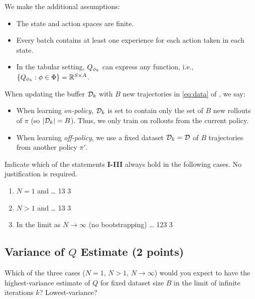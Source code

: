 We make the additional assumptions: 
\begin{itemize}
	\item The state and action spaces are finite.
	\item Every batch contains at least one experience for each action taken in each state.
	\item In the tabular setting, $Q_{\phi_k}$ can express any function, i.e., $\{Q_{\phi_k}:\phi\in\Phi\}=\mathbb{R}^{S\times A}$.
\end{itemize}
When updating the buffer $\mathcal{D}_k$ with $B$ new trajectories in \cref{eq:data} of , we say:
\begin{itemize}
    \item When learning \textit{on-policy}, $\mathcal{D}_k$ is set to contain only the set of $B$ new rollouts of $\pi$ (so $\lvert \mathcal{D}_k \rvert = B$). Thus, we only train on rollouts from the current policy.
	\item When learning \textit{off-policy}, we use a fixed dataset $\mathcal{D}_k=\mathcal{D}$ of $B$ trajectories from another policy $\pi'$. 
\end{itemize}

Indicate which of the statements \textbf{I-III} always hold in the following cases. No justification is required.
\ifsolutions\solve\thesubsection\else
\begin{enumerate}
\item $N=1$ and \ldots \makecols\ncol\heading\choices
	{13} %
	{3} %
\item $N>1$ and \ldots \choices
	{13} %
	{3} %
\item In the limit as $N\to\infty$ (no bootstrapping) \ldots \choices
	{123} %
	{3} %
\end{enumerate}
\fi

\subsection{Variance of $Q$ Estimate (2 points)}
\label{q:variance_estimate}
Which of the three cases ($N = 1$, $N > 1$, $N \to \infty$) would you expect to have the highest-variance estimate of $Q$ for fixed dataset size $B$ in the limit of infinite iterations $k$? Lowest-variance?

